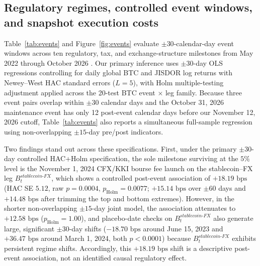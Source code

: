 \subsection{Regulatory regimes, controlled event windows, and snapshot execution costs}
Table~\ref{tab:events} and Figure~\ref{fig:events} evaluate $\pm 30$-calendar-day event windows across ten regulatory, tax, and exchange-structure milestones from May 2022 through October 2026 \citep{pmk68_2022,binance_bidr_2024,indodax_events_2026,perba9_2024,pojk27_2024,pmk50_2025,cfx_seb001_2026,bi_padg072026}. Our primary inference uses $\pm 30$-day OLS regressions controlling for daily global BTC and JISDOR log returns with Newey--West HAC standard errors ($L=5$), with Holm multiple-testing adjustment applied across the 20-test BTC event $\times$ leg family. Because three event pairs overlap within $\pm 30$ calendar days and the October 31, 2026 maintenance event has only 12 post-event calendar days before our November 12, 2026 cutoff, Table~\ref{tab:events} also reports a simultaneous full-sample regression using non-overlapping $\pm 15$-day pre/post indicators.



Two findings stand out across these specifications. First, under the primary $\pm 30$-day controlled HAC+Holm specification, the sole milestone surviving at the $5\%$ level is the November 1, 2024 CFX/KKI bourse fee launch on the stablecoin--FX leg $B_t^{stablecoin\text{-}FX}$, which shows a controlled post-event association of $+18.19\text{ bps}$ (HAC SE $5.12$, raw $p = 0.0004$, $p_{\text{Holm}} = 0.0077$; $+15.14\text{ bps}$ over $\pm 60$ days and $+14.48\text{ bps}$ after trimming the top and bottom extremes). However, in the shorter non-overlapping $\pm 15$-day joint model, the association attenuates to $+12.58\text{ bps}$ ($p_{\text{Holm}} = 1.00$), and placebo-date checks on $B_t^{stablecoin\text{-}FX}$ also generate large, significant $\pm 30$-day shifts ($-18.70\text{ bps}$ around June 15, 2023 and $+36.47\text{ bps}$ around March 1, 2024, both $p < 0.0001$) because $B_t^{stablecoin\text{-}FX}$ exhibits persistent regime shifts. Accordingly, this $+18.19\text{ bps}$ shift is a descriptive post-event association, not an identified causal regulatory effect.

